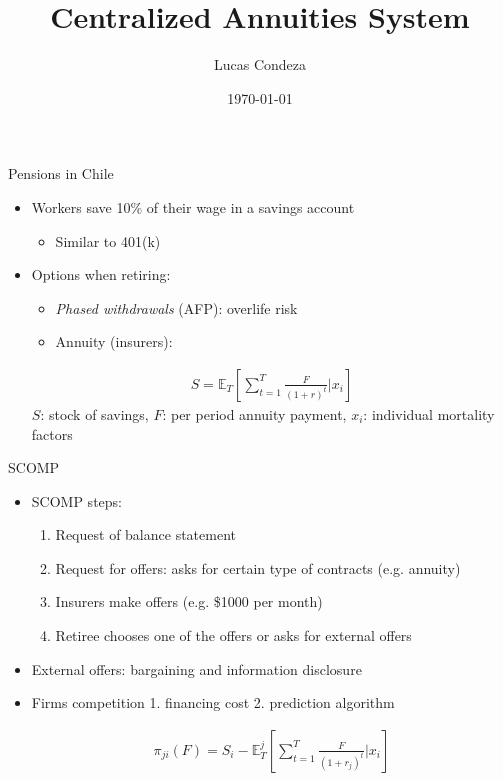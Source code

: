 \documentclass[10pt,aspectratio=169]{beamer}
\title{Centralized Annuities System}
\author{%
 Lucas Condeza
\inst{1} \and
}
\institute{
  \inst{1} Yale University \\
}
\date{\today}
\begin{document}
\begin{frame}
  \titlepage
\end{frame}


\begin{frame}{Pensions in Chile}    
    \begin{itemize}%
        \item Workers save 10\% of their wage in a savings account 

        \begin{itemize}
            \item Similar to 401(k)
        \end{itemize} 
        
        \item Options when retiring: 
        \begin{itemize}
            \item \textit{Phased withdrawals} (AFP): overlife risk

            \item Annuity (insurers): 
        \end{itemize}
         \begin{align*}
     S = \mathbb{E}_{T} \left[\sum_{t=1}^T\frac{F}{(1+r)^t}| x_i\right]
 \end{align*}
 $S$: stock of savings, $F$: per period annuity payment, $x_i$: individual mortality factors
\end{itemize} 
\end{frame}



\begin{frame}{SCOMP} 
    \begin{itemize}%
    \item SCOMP steps: 
    \begin{enumerate}
        \item Request of balance statement 
        \item Request for offers: asks for certain type of contracts (e.g. annuity)
        \item Insurers make offers (e.g. \$1000 per month)
        \item Retiree chooses one of the offers or asks for external offers

    \end{enumerate}

        \item External offers: bargaining and information disclosure
    

    \item Firms competition 1. financing cost 2. prediction algorithm 

    \begin{align*}
    \pi_{ji}(F) = S_i-  \mathbb{E}^j_{T} \left[\sum_{t=1}^T\frac{F}{(1+r_j)^t}|x_i \right]
    \end{align*}
    \end{itemize}
\end{frame}
\end{document}
